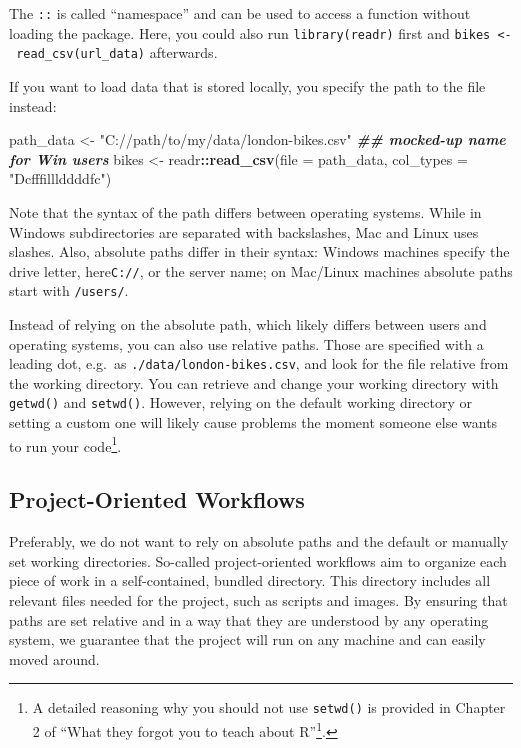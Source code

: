 \documentclass[
]{krantz}
\makeatletter
\newenvironment{Shaded}{\begin{snugshade}}{\end{snugshade}}
\newcommand{\AttributeTok}[1]{\textcolor[rgb]{0.27,0.27,0.27}{#1}}
\newcommand{\DocumentationTok}[1]{\textcolor[rgb]{0.37,0.37,0.37}{\textbf{\textit{#1}}}}
\newcommand{\FunctionTok}[1]{\textcolor[rgb]{0.27,0.27,0.27}{\textbf{#1}}}
\newcommand{\NormalTok}[1]{#1}
\newcommand{\OtherTok}[1]{\textcolor[rgb]{0.37,0.37,0.37}{#1}}
\newcommand{\SpecialCharTok}[1]{\textcolor[rgb]{0.43,0.43,0.43}{\textbf{#1}}}
\newcommand{\StringTok}[1]{\textcolor[rgb]{0.5,0.5,0.5}{#1}}
\renewcommand{\href}[2]{#2\footnote{\url{#1}}}
\newenvironment{kframe}{%
\medskip{}
\setlength{\fboxsep}{.8em}
 \def\at@end@of@kframe{}%
 \ifinner\ifhmode%
  \def\at@end@of@kframe{\end{minipage}}%
  \begin{minipage}{\columnwidth}%
 \fi\fi%
 \def\FrameCommand##1{\hskip\@totalleftmargin \hskip-\fboxsep
 \colorbox{shadecolor}{##1}\hskip-\fboxsep
     \hskip-\linewidth \hskip-\@totalleftmargin \hskip\columnwidth}%
 \MakeFramed {\advance\hsize-\width
   \@totalleftmargin\z@ \linewidth\hsize
   \@setminipage}}%
 {\par\unskip\endMakeFramed%
 \at@end@of@kframe}
\renewenvironment{Shaded}{\begin{kframe}}{\end{kframe}}
\makeatother
\begin{document}
The \texttt{::} is called ``namespace'' and can be used to access a function without loading the package. Here, you could also run \texttt{library(readr)} first and \texttt{bikes\ \textless{}-\ read\_csv(url\_data)} afterwards.

If you want to load data that is stored locally, you specify the path to the file instead:

\begin{Shaded}
\begin{Highlighting}[]
\NormalTok{path\_data }\OtherTok{\textless{}{-}} \StringTok{"C://path/to/my/data/london{-}bikes.csv"} \DocumentationTok{\#\# mocked{-}up name for Win users}
\NormalTok{bikes }\OtherTok{\textless{}{-}}\NormalTok{ readr}\SpecialCharTok{::}\FunctionTok{read\_csv}\NormalTok{(}\AttributeTok{file =}\NormalTok{ path\_data, }\AttributeTok{col\_types =} \StringTok{"Dcfffilllddddfc"}\NormalTok{)}
\end{Highlighting}
\end{Shaded}

Note that the syntax of the path differs between operating systems. While in Windows subdirectories are separated with backslashes, Mac and Linux uses slashes. Also, absolute paths differ in their syntax: Windows machines specify the drive letter, here\texttt{C://}, or the server name; on Mac/Linux machines absolute paths start with \texttt{/users/}.

Instead of relying on the absolute path, which likely differs between users and operating systems, you can also use relative paths. Those are specified with a leading dot, e.g.~as \texttt{./data/london-bikes.csv}, and look for the file relative from the working directory. You can retrieve and change your working directory with \texttt{getwd()} and \texttt{setwd()}. However, relying on the default working directory or setting a custom one will likely cause problems the moment someone else wants to run your code\footnote{A detailed reasoning why you should not use \texttt{setwd()} is provided in \href{https://rstats.wtf/project-oriented-workflow.html}{Chapter 2 of ``What they forgot you to teach about R''}.}.

\hypertarget{workflows}{%
\subsection{Project-Oriented Workflows}\label{workflows}}

Preferably, we do not want to rely on absolute paths and the default or manually set working directories. So-called project-oriented workflows aim to organize each piece of work in a self-contained, bundled directory. This directory includes all relevant files needed for the project, such as scripts and images. By ensuring that paths are set relative and in a way that they are understood by any operating system, we guarantee that the project will run on any machine and can easily moved around.
\end{document}

